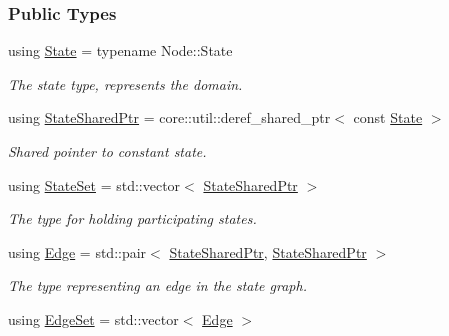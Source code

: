 \subsubsection*{Public Types}
\begin{DoxyCompactItemize}
\item 
using \hyperlink{structUniformChange_abdf82f7a2951273f647069ce9be73183}{State} = typename Node\+::\+State\hypertarget{structUniformChange_abdf82f7a2951273f647069ce9be73183}{}\label{structUniformChange_abdf82f7a2951273f647069ce9be73183}

\begin{DoxyCompactList}\small\item\em The state type, represents the domain. \end{DoxyCompactList}\item 
using \hyperlink{structUniformChange_aeff54c3445464a5f6c1414b9c26076b2}{State\+Shared\+Ptr} = core\+::util\+::deref\+\_\+shared\+\_\+ptr$<$ const \hyperlink{structEventBase_a174eb2c38ec68481b21f78db338e834c}{State} $>$\hypertarget{structUniformChange_aeff54c3445464a5f6c1414b9c26076b2}{}\label{structUniformChange_aeff54c3445464a5f6c1414b9c26076b2}

\begin{DoxyCompactList}\small\item\em Shared pointer to constant state. \end{DoxyCompactList}\item 
using \hyperlink{structUniformChange_afc89af5d5e897d7664eb9ae7770d145c}{State\+Set} = std\+::vector$<$ \hyperlink{structEventBase_a2c0edb5cda08ce1965f3440a97b3fc87}{State\+Shared\+Ptr} $>$\hypertarget{structUniformChange_afc89af5d5e897d7664eb9ae7770d145c}{}\label{structUniformChange_afc89af5d5e897d7664eb9ae7770d145c}

\begin{DoxyCompactList}\small\item\em The type for holding participating states. \end{DoxyCompactList}\item 
using \hyperlink{structUniformChange_a34b7655a38ac1deb98a5978cb1ad5cf6}{Edge} = std\+::pair$<$ \hyperlink{structEventBase_a2c0edb5cda08ce1965f3440a97b3fc87}{State\+Shared\+Ptr}, \hyperlink{structEventBase_a2c0edb5cda08ce1965f3440a97b3fc87}{State\+Shared\+Ptr} $>$\hypertarget{structUniformChange_a34b7655a38ac1deb98a5978cb1ad5cf6}{}\label{structUniformChange_a34b7655a38ac1deb98a5978cb1ad5cf6}

\begin{DoxyCompactList}\small\item\em The type representing an edge in the state graph. \end{DoxyCompactList}\item 
using \hyperlink{structUniformChange_a2afec8b1a5887f2c6fad054d6b739fc5}{Edge\+Set} = std\+::vector$<$ \hyperlink{structUniformChange_a34b7655a38ac1deb98a5978cb1ad5cf6}{Edge} $>$\hypertarget{structUniformChange_a2afec8b1a5887f2c6fad054d6b739fc5}{}\label{structUniformChange_a2afec8b1a5887f2c6fad054d6b739fc5}


\end{DoxyCompactItemize}
